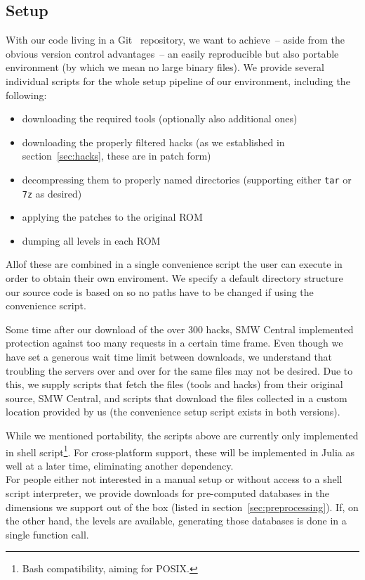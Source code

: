\subsection{Setup}

With our code living in a Git~\cite{Git} repository, we want to
achieve~-- aside from the obvious version control advantages~-- an
easily reproducible but also portable environment (by which we mean no
large binary files). We provide several individual scripts for the
whole setup pipeline of our environment, including the following:
\begin{itemize}
\item downloading the required tools (optionally also additional ones)
\item downloading the properly filtered hacks (as we established in
  section~\ref{sec:hacks}, these are in patch form)
\item decompressing them to properly named directories (supporting
  either \texttt{tar} or \texttt{7z} as desired)
\item applying the patches to the original ROM
\item dumping all levels in each ROM
\end{itemize}
Allof these are combined in a single convenience script
the user can execute in order to obtain their own enviroment. We
specify a default directory structure our source code is based on so
no paths have to be changed if using the convenience script.

Some time after our download of the over 300 hacks, SMW Central
implemented protection against too many requests in a certain time
frame. Even though we have set a generous wait time limit between
downloads, we understand that troubling the servers over and over for
the same files may not be desired. Due to this, we supply scripts that
fetch the files (tools and hacks) from their original source, SMW
Central, and scripts that download the files collected in a custom
location provided by us (the convenience setup script exists in both
versions).

While we mentioned portability, the scripts above are currently only
implemented in shell script\footnote{Bash compatibility, aiming for
  POSIX.}. For cross-platform support, these will be implemented in
Julia as well at a later time, eliminating another dependency. \\
For people either not interested in a manual setup or without access
to a shell script interpreter, we provide downloads for pre-computed
databases in the dimensions we support out of the box (listed in
section~\ref{sec:preprocessing}). If, on the other hand, the levels
are available, generating those databases is done in a single function
call.

